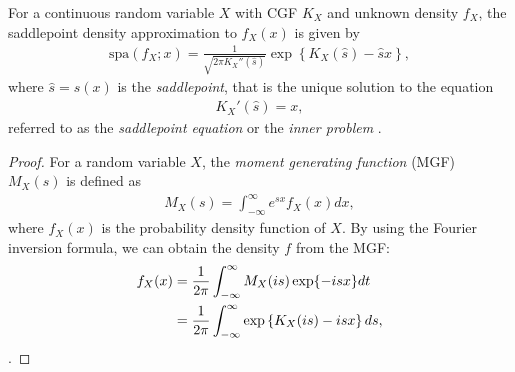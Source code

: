 \begin{theorem}\label{Chap3.2 SPA th}
	For a continuous random variable $X$ with CGF $K_X$ and unknown density $f_X$, the saddlepoint density approximation to $f_X(x)$ is given by 
	\begin{align}
	\text{spa}\left(f_{X};x\right) = \frac{1}{\sqrt{2\pi K_X''(\hat{s})}}\exp\left\{ K_X(\hat{s})-\hat{s}x  \right\},
	\end{align}
	where $\hat{s}=\hat{s}(x)$ is the \textit{saddlepoint}, that is the unique solution to the equation
	\begin{align}\label{Chap3.2 IP}
	K_X'(\hat{s}) = x,
	\end{align}
	referred to as the \textit{saddlepoint equation} or the \textit{inner problem} \citep{butler2007saddlepoint}.
	
	\begin{proof}
		For a random variable $X$, the \textit{moment generating function} (MGF) $M_X(s)$ is defined as
		\begin{align}
		M_X(s)=\int_{-\infty}^{\infty} e^{sx}f_X(x)dx,
		\end{align}
		where $f_X(x)$ is the probability density function of $X$. By using the Fourier inversion formula, we can obtain the density $f$ from the MGF:
		\begin{align}\label{Chap3.2 fourier inversion int}
		f_X(x)&=\frac{1}{2\pi}\int_{-\infty}^{\infty}M_X(is)\exp\{-isx\} dt\notag\\
		&=\frac{1}{2\pi}\int_{-\infty}^{\infty}\exp\left\{ K_X(is)-isx \right\} ds,
		\end{align}
		\citep{goutis1999explaining}.
		
		

\end{proof}
\end{theorem}
